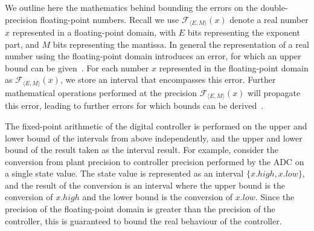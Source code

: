 We outline here the mathematics behind bounding the errors on the double-precision floating-point numbers. 
Recall we use $\mathcal{F}_{\langle E,M \rangle}(x)$ denote a real number $x$ represented in a floating-point domain, 
with $E$ bits representing the exponent part, and $M$ bits representing the mantissa. 
In general the representation of a real number using the floating-point domain introduces an error, 
for which an upper bound can be given~\cite{DBLP:conf/arith/BrainTRW15}.
For each number $x$ represented in the floating-point domain as $\mathcal{F}_{\langle E,M \rangle}(x)$, 
we store an interval that encompasses this error. 
Further mathematical operations performed at the precision $\mathcal{F}_{\langle E,M \rangle}(x)$ will propagate this error, 
leading to further errors for which bounds can be derived~\cite{DBLP:conf/arith/BrainTRW15}.  

The fixed-point arithmetic of the digital controller is performed on the upper and lower bound of the intervals from above independently, and the upper and lower bound of the result taken as the interval result. For example,
consider the conversion from plant precision to controller precision performed by the ADC on a single state value. The state value is represented as an interval $\{x.high, x.low\}$, and the result of the conversion is an interval where the upper bound is the conversion of $x.high$ and the lower bound is the conversion of $x.low$. 
Since the precision of the floating-point domain is greater than the precision of the controller, this is guaranteed to bound the real behaviour of the controller. 



\ifx\axelerator


